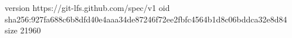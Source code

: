 version https://git-lfs.github.com/spec/v1
oid sha256:927fa688c6b8dfd40e4aaa34de87246f72ee2fbfc4564b1d8c06bddca32e8d84
size 21960
